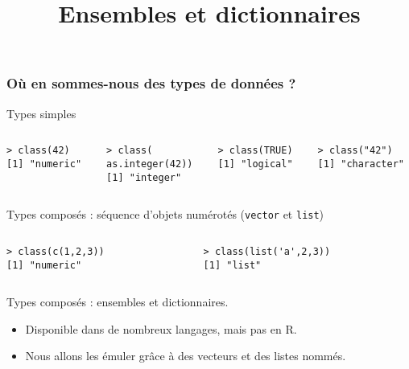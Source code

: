 \documentclass[10pt]{beamer}
\title{Ensembles et dictionnaires}
\begin{document}
\maketitle


\begin{frame}[fragile]
  \frametitle{Où en sommes-nous des types de données ?}
  \begin{block}{Types simples}

  \begin{columns}[t]
\begin{column}{0.25\textwidth}
  \begin{lstlisting}
> class(42)
[1] "numeric"
  \end{lstlisting}
\end{column}
\begin{column}{0.25\textwidth}
  \begin{lstlisting}
> class(
as.integer(42))
[1] "integer"
  \end{lstlisting}
\end{column}


\begin{column}{0.25\textwidth}
  \begin{lstlisting}
> class(TRUE)
[1] "logical"
  \end{lstlisting}
\end{column}
\begin{column}{0.25\textwidth}
  \begin{lstlisting}
> class("42")
[1] "character"
  \end{lstlisting}
\end{column}
\end{columns}
\end{block}


\begin{block}{Types composés : séquence d'objets numérotés (\texttt{vector} et \texttt{list})}

\begin{columns}[t]
\begin{column}{0.48\textwidth}
  \begin{lstlisting}
> class(c(1,2,3))
[1] "numeric"
  \end{lstlisting}
\end{column}
\begin{column}{0.48\textwidth}
  \begin{lstlisting}
> class(list('a',2,3))
[1] "list"
  \end{lstlisting}
\end{column}
\end{columns}
\end{block}

\begin{alertblock}{Types composés : ensembles et dictionnaires.}
  \begin{itemize}
  \item Disponible dans de nombreux langages, mais pas en R.
  \item<alert@1> Nous allons les émuler grâce à des vecteurs et des listes nommés.
  \end{itemize}
\end{alertblock}
\end{frame}
\end{document}

